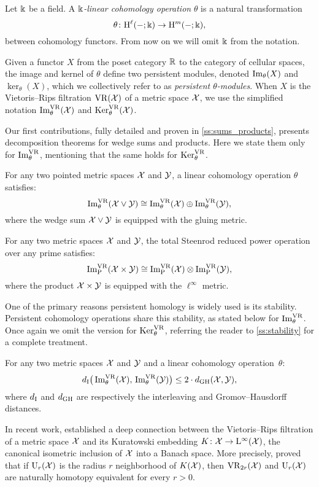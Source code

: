 \medskip Let \(\Bbbk\) be a field.
A \textit{\(\Bbbk\)-linear cohomology operation} \(\theta\) is a natural transformation
\[
\theta \colon \mathrm{H}^\ell(-;\Bbbk) \to \mathrm{H}^m(-;\Bbbk),
\]
between cohomology functors.
From now on we will omit \(\Bbbk\) from the notation.

Given a functor \(X\) from the poset category $\mathbb{R}$ to the category of cellular spaces, the image and kernel of \(\theta\) define two persistent modules, denoted \(\operatorname{Im}_\theta(X)\) and \(\ker_\theta(X)\), which we collectively refer to as \textit{persistent \(\theta\)-modules}.
When \(X\) is the Vietoris--Rips filtration \(\mathrm{VR}(\mathcal{X})\) of a metric space \(\mathcal{X}\), we use the simplified notation \(\operatorname{Im}_\theta^{\mathrm{VR}}(\mathcal{X})\) and \(\operatorname{Ker}_\theta^{\mathrm{VR}}(\mathcal{X})\).

Our first contributions, fully detailed and proven in \cref{ss:sums_products}, presents decomposition theorems for wedge sums and products.
Here we state them only for \(\operatorname{Im}^{\mathrm{VR}}_\theta\), mentioning that the same holds for \(\operatorname{Ker}^{\mathrm{VR}}_\theta\).

\medskip\theorem For any two pointed metric spaces $\mathcal{X}$ and $\mathcal{Y}$, a linear cohomology operation \(\theta\) satisfies:
\[
\operatorname{Im}_\theta^{\mathrm{VR}}(\mathcal{X} \vee \mathcal{Y}) \cong \operatorname{Im}_\theta^{\mathrm{VR}}(\mathcal{X}) \oplus \operatorname{Im}_\theta^{\mathrm{VR}}(\mathcal{Y}),
\]
where the wedge sum \(\mathcal{X} \vee \mathcal{Y}\) is equipped with the gluing metric.

\medskip\theorem
For any two metric spaces $\mathcal{X}$ and $\mathcal{Y}$, the total Steenrod reduced power operation over any prime satisfies:
\[
\operatorname{Im}^{\mathrm{VR}}_{\mathrm{P}}(\mathcal{X} \times \mathcal{Y}) \cong \operatorname{Im}^{\mathrm{VR}}_{\mathrm{P}}(\mathcal{X}) \otimes \operatorname{Im}^{\mathrm{VR}}_{\mathrm{P}}(\mathcal{Y}),
\]
where the product \(\mathcal{X} \times \mathcal{Y}\) is equipped with the \(\ell^\infty\) metric.

\medskip One of the primary reasons persistent homology is widely used is its stability.
Persistent cohomology operations share this stability, as stated below for \(\operatorname{Im}^{\mathrm{VR}}_\theta\).
Once again we omit the version for \(\operatorname{Ker}^{\mathrm{VR}}_\theta\), referring the reader to \cref{ss:stability} for a complete treatment.

\medskip\theorem For any two metric spaces $\mathcal{X}$ and $\mathcal{Y}$ and a linear cohomology operation~$\theta$:
\[
d_{\mathrm{I}}\big(\operatorname{Im}_\theta^{\mathrm{VR}}(\mathcal{X}),\, \operatorname{Im}_\theta^{\mathrm{VR}}(\mathcal{Y})\big) \leq 2 \cdot d_{\mathrm{GH}}(\mathcal{X},\mathcal{Y}),
\]
where \(d_{\mathrm{I}}\) and \(d_{\mathrm{GH}}\) are respectively the interleaving and Gromov--Hausdorff distances.

\medskip In recent work, \cite{lim2024vietoris} established a deep connection between the Vietoris--Rips filtration of a metric space \(\mathcal{X}\) and its Kuratowski embedding \(K \colon \mathcal{X} \to \mathrm{L}^\infty(\mathcal{X})\), the canonical isometric inclusion of \(\mathcal{X}\) into a Banach space.
More precisely, \cite{lim2024vietoris} proved that if \(\mathrm{U}_r(\mathcal{X})\) is the radius \(r\) neighborhood of \(K(\mathcal{X})\), then \(\mathrm{VR}_{2r}(\mathcal{X})\) and \(\mathrm{U}_r(\mathcal{X})\) are naturally homotopy equivalent for every \(r > 0\).


